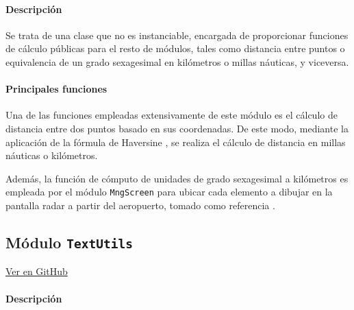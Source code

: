 \paragraph{Descripción} \phantom{\newline}

Se trata de una clase que no es instanciable, encargada de proporcionar funciones de cálculo públicas para el resto de módulos, tales como distancia entre puntos o equivalencia de un grado sexagesimal en kilómetros o millas náuticas, y viceversa.

\paragraph{Principales funciones} \phantom{\newline}

Una de las funciones empleadas extensivamente de este módulo es el cálculo de distancia entre dos puntos basado en sus coordenadas. De este modo, mediante la aplicación de la fórmula de Haversine \cite{Haversine}, se realiza el cálculo de distancia en millas náuticas o kilómetros.

Además, la función de cómputo de unidades de grado sexagesimal a kilómetros es empleada por el módulo \texttt{MngScreen} para ubicar cada elemento a dibujar en la pantalla radar a partir del aeropuerto, tomado como referencia \cite{MichaelTaylor}.




\subsection{Módulo \texttt{TextUtils}}
\label{subsec:ClaseMeasurement}

\vspace{-0.85cm}
\begin{flushright}
\href{https://github.com/macgyver912/atc-simulator/blob/jaime/Assets/Scripts/utils/TextUtils.cs}{Ver en GitHub \faGithub}
\end{flushright}

\paragraph{Descripción} \phantom{\newline}

